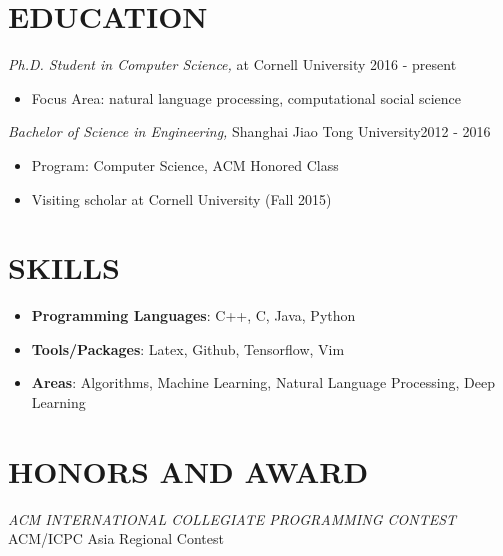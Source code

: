 \documentclass[margin, 10pt]{res} %
\begin{document}
\begin{resume}



\section{EDUCATION}

{\sl Ph.D. Student in Computer Science,} at Cornell University \hfill 2016 - present 
\begin{itemize}
\item Focus Area: natural language processing, computational social science
\end{itemize}
{\sl Bachelor of Science in Engineering,} Shanghai Jiao Tong University\hfill 2012 - 2016
\begin{itemize} 
\item Program: Computer Science, ACM Honored Class
\item Visiting scholar at Cornell University (Fall 2015) 
\end{itemize}

\section{SKILLS}
\begin{itemize}
\item \textbf{Programming Languages}: C++, C, Java, Python
\item \textbf{Tools/Packages}: Latex, Github, Tensorflow, Vim
\item \textbf{Areas}: Algorithms, Machine Learning, Natural Language Processing, Deep Learning
\end{itemize}

 

\section{HONORS AND AWARD}

{\sl ACM INTERNATIONAL COLLEGIATE PROGRAMMING CONTEST} \\
ACM/ICPC Asia Regional Contest 


\end{resume}
\end{document}

